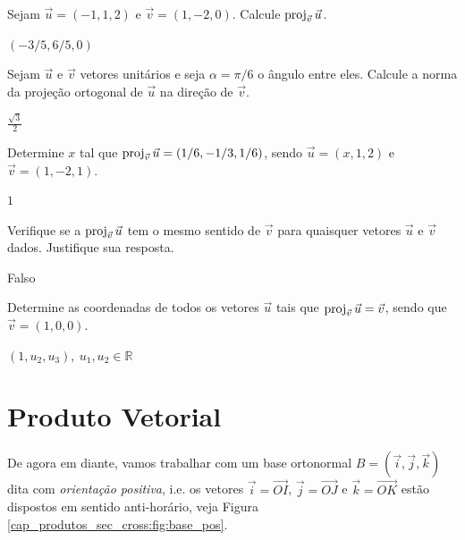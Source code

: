 \begin{exer}
  Sejam $\vec{u}=(-1,1,2)$ e $\vec{v}=(1,-2,0)$. Calcule $\operatorname{proj}_{\vec{v}}\vec{u}$.
\end{exer}
\begin{resp}
  $(-3/5, 6/5, 0)$
\end{resp}

\begin{exer}
  Sejam $\vec{u}$ e $\vec{v}$ vetores unitários e seja $\alpha = \pi/6$ o ângulo entre eles. Calcule a norma da projeção ortogonal de $\vec{u}$ na direção de $\vec{v}$.
\end{exer}
\begin{resp}
  $\frac{\sqrt{3}}{2}$
\end{resp}

\begin{exer}
  Determine $x$ tal que $\operatorname{proj}_{\vec{v}}\vec{u}=(1/6, -1/3, 1/6)$, sendo $\vec{u}=(x,1,2)$ e $\vec{v}=(1,-2,1)$.
\end{exer}
\begin{resp}
  $1$
\end{resp}

\begin{exer}
  Verifique se a $\operatorname{proj}_{\vec{v}}\vec{u}$ tem o mesmo sentido de $\vec{v}$ para quaisquer vetores $\vec{u}$ e $\vec{v}$ dados. Justifique sua resposta.
\end{exer}
\begin{resp}
  Falso
\end{resp}

\begin{exer}
  Determine as coordenadas de todos os vetores $\vec{u}$ tais que $\operatorname{proj}_{\vec{v}}\vec{u}=\vec{v}$, sendo que $\vec{v}=(1,0,0)$.
\end{exer}
\begin{resp}
  $(1,u_2,u_3),~u_1,u_2\in\mathbb{R}$
\end{resp}

\section{Produto Vetorial}\label{cap_produtos_sec_cross}
\badgeRevisar

De agora em diante, vamos trabalhar com um base ortonormal $B = (\vec{i}, \vec{j}, \vec{k})$ dita com \emph{orientação positiva}, i.e. os vetores $\vec{i} = \overrightarrow{OI}$, $\vec{j} = \overrightarrow{OJ}$ e $\vec{k}=\overrightarrow{OK}$ estão dispostos em sentido anti-horário, veja Figura \ref{cap_produtos_sec_cross:fig:base_pos}.

